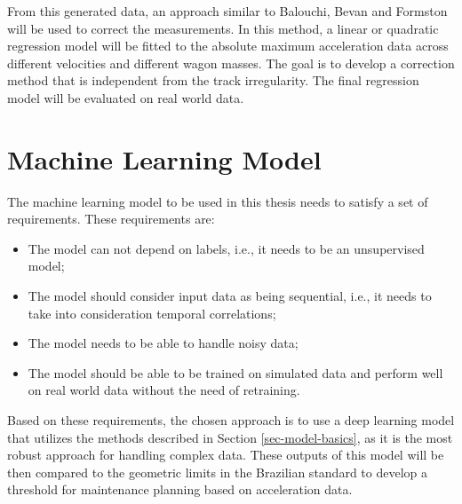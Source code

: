 From this generated data, an approach similar to Balouchi, Bevan and Formston \cite{Balouchi02092021} will be used to correct the measurements. In this method, a linear or quadratic regression model will be fitted to the absolute maximum acceleration data across different velocities and different wagon masses. The goal is to develop a correction method that is independent from the track irregularity. The final regression model will be evaluated on real world data.

\section{Machine Learning Model} \label{sec-ml-model}

The machine learning model to be used in this thesis needs to satisfy a set of requirements. These requirements are:
\begin{itemize}
    \item The model can not depend on labels, i.e., it needs to be an unsupervised model;
    \item The model should consider input data as being sequential, i.e., it needs to take into consideration temporal correlations;
    \item The model needs to be able to handle noisy data;
    \item The model should be able to be trained on simulated data and perform well on real world data without the need of retraining.
\end{itemize}

Based on these requirements, the chosen approach is to use a deep learning model that utilizes the methods described in Section \ref{sec-model-basics}, as it is the most robust approach for handling complex data. These outputs of this model will be then compared to the geometric limits in the Brazilian standard to develop a threshold for maintenance planning based on acceleration data.
